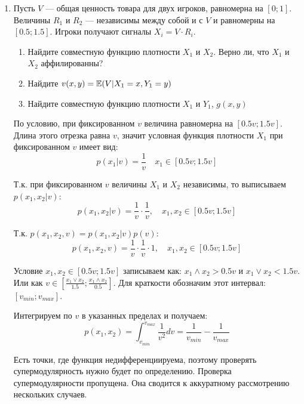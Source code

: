 \begin{enumerate}


\item Пусть $  V $ --- общая ценность товара для двух игроков, равномерна на $ [0;1] $. Величины $ R_{1} $ и $ R_{2} $ --- независимы между собой и с $ V $ и равномерны на $ [0.5;1.5] $. Игроки получают сигналы $ X_{i}=V\cdot R_{i} $. 
\begin{enumerate}
\item Найдите совместную функцию плотности $ X_{1} $ и $ X_{2} $. Верно ли, что $ X_{1} $ и $ X_{2} $ аффилированны?
\item Найдите $ v(x,y)=\mathbb{E}(V|X_{1}=x,Y_{1}=y) $ 
\item Найдите совместную функцию плотности $ X_{1} $ и $ Y_{1} $, $ g(x,y) $
\end{enumerate}

По условию, при фиксированном $ v $ величина равномерна на $ [0.5v;1.5v] $. Длина этого отрезка равна $ v $, значит условная функция плотности $ X_{1} $ при фиксированном $ v $ имеет вид:
\begin{equation}
p(x_{1}|v)=\frac{1}{v}\quad x_{1}\in [0.5v;1.5v]
\end{equation}


Т.к. при фиксированном $ v $ величины $X_{1}  $ и $ X_{2} $ независимы, то выписываем $ p(x_{1},x_{2}|v) $:
\begin{equation}
p(x_{1},x_{2}|v)=\frac{1}{v}\cdot \frac{1}{v}, \quad x_{1},x_{2}\in [0.5v;1.5v]
\end{equation}

Т.к. $ p(x_{1},x_{2},v)=p(x_{1},x_{2}|v)p(v) $:
\begin{equation}
p(x_{1},x_{2},v)=\frac{1}{v}\cdot \frac{1}{v}\cdot 1, \quad x_{1},x_{2}\in [0.5v;1.5v]
\end{equation}

Условие $ x_{1},x_{2}\in [0.5v;1.5v] $ записываем как: $ x_{1}\wedge x_{2} > 0.5v $ и $ x_{1}\vee x_{2} <1.5v $. Или как $ v\in [\frac{x_{1}\vee x_{2}}{1.5};\frac{x_{1}\wedge x_{2}}{0.5}] $. Для краткости обозначим этот интервал: $ [v_{min};v_{max}] $.

Интегрируем по $ v $ в указанных пределах и получаем:
\begin{equation}
p(x_{1},x_{2})=\int_{v_{min}}^{v_{max}}\frac{1}{v^{2}}dv=\frac{1}{v_{min}}-\frac{1}{v_{max}}
\end{equation}

Есть точки, где функция недифференциируема, поэтому проверять супермодулярность нужно будет по определению. Проверка супермодулярности пропущена. Она сводится к аккуратному рассмотрению нескольких случаев.


\end{enumerate}
